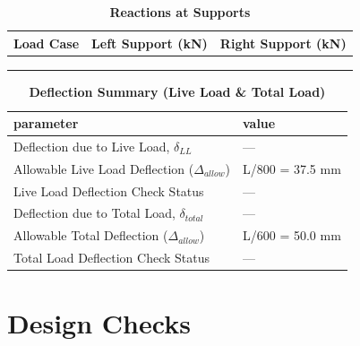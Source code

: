 \documentclass[12pt,a4paper]{report}
\numberwithin{table}{chapter}
\numberwithin{figure}{chapter}
\begin{document}
\vspace{1em}
\begin{longtable}{|>{\centering\arraybackslash}p{5.2cm}|>{\centering\arraybackslash}p{5.2cm}|>{\centering\arraybackslash}p{5.2cm}|}
\caption{\textbf{Reactions at Supports}}
\hline
\textbf{Load Case} & \textbf{Left Support (kN)} & \textbf{Right Support (kN)} \\[6pt]
\hline
 &  &  \\[6pt]
\hline
 &  &  \\[6pt]
\hline
 &  &  \\[6pt]
\hline
\end{longtable}

\vspace{1em}
\begin{longtable}{|L{7cm}|p{8.5cm}|}
\caption{\textbf{Deflection Summary (Live Load \& Total Load)}}
\hline
\textbf{parameter} & \textbf{value} \\
\hline
\textnormal{Deflection due to Live Load, $\delta_{LL}$} & --- \\[6pt]
\hline
\textnormal{Allowable Live Load Deflection ($\Delta_{allow}$)} & L/800 = 37.5 mm \\[6pt]
\hline
\textnormal{Live Load Deflection Check Status} & --- \\[6pt]
\hline
\textnormal{Deflection due to Total Load, $\delta_{total}$} & --- \\[6pt]
\hline
\textnormal{Allowable Total Deflection ($\Delta_{allow}$)} & L/600 = 50.0 mm \\[6pt]
\hline
\textnormal{Total Load Deflection Check Status} & --- \\[6pt]
\hline
\end{longtable}

\vspace{1em}
\noindent
\noindent{}
\noindent{}
\noindent{}


\chapter{Design Checks}
\end{document}
